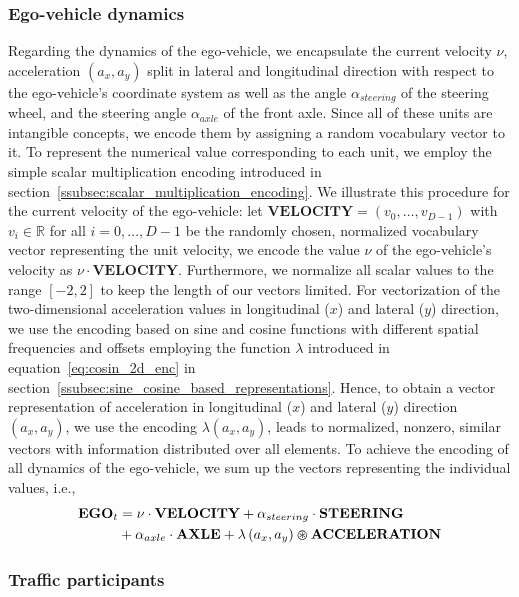 \subsubsection{Ego-vehicle dynamics}
\label{subsubsec:ego-veh-dyn}

Regarding the dynamics of the ego-vehicle, we encapsulate the current velocity $\nu$, acceleration $(a_x, a_y)$ split in lateral and longitudinal direction with respect to the ego-vehicle's coordinate system  as well as the angle $\alpha_{steering}$ of the steering wheel, and the steering angle $\alpha_{axle}$ of the front axle.
Since all of these units are intangible concepts, we encode them by assigning a random vocabulary vector to it.
To represent the numerical value corresponding to each unit, we employ the simple scalar multiplication encoding introduced in section~\ref{ssubsec:scalar_multiplication_encoding}.
We illustrate this procedure for the current velocity of the ego-vehicle: let $ \mathbf{VELOCITY} = \left(v_0, \ldots, v_{D-1}\right)$ with $v_i \in \mathbb{R}$ for all $i=0, \ldots, D-1$ be the randomly chosen, normalized vocabulary vector representing the unit velocity, we encode the value $\nu$ of the ego-vehicle's velocity as $\nu \cdot \mathbf{VELOCITY}$.
Furthermore, we normalize all scalar values to the range $\left[-2,2\right]$ to keep the length of our vectors limited.
For vectorization of the two-dimensional acceleration values in longitudinal ($x$) and lateral ($y$) direction, we use the encoding based on sine and cosine functions with different spatial frequencies and offsets employing the function $\lambda$ introduced in equation~\eqref{eq:cosin_2d_enc} in section~\ref{ssubsec:sine_cosine_based_representations}.
Hence, to obtain a vector representation of acceleration in longitudinal ($x$) and lateral ($y$) direction $(a_x, a_y)$, we use the encoding $\lambda\left(a_x, a_y\right)$, leads to normalized, nonzero, similar vectors with information distributed over all elements.
To achieve the encoding of all dynamics of the ego-vehicle, we sum up the vectors representing the individual values, i.e.,
\begin{align}
\label{eq:ego_dynamics}
\mathbf{EGO}_{t} &= \nu \cdot \mathbf{VELOCITY} + \alpha_{steering} \cdot\mathbf{STEERING} \nonumber \\
             &+ \alpha_{axle} \cdot\mathbf{AXLE} + \lambda\left(a_x, a_y\right) \varoast \mathbf{ACCELERATION}
\end{align}
\subsubsection{Traffic participants}%
\label{ssubsec:traffic_participants_context_class}

